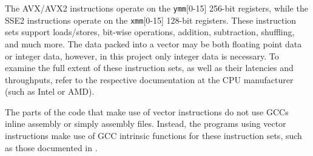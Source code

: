 The AVX/AVX2 instructions operate on the \texttt{ymm}[0-15] 256-bit registers, while the SSE2 instructions operate on the \texttt{xmm}[0-15] 128-bit registers. These instruction sets support loads/stores, bit-wise operations, addition, subtraction, shuffling, and much more. The data packed into a vector may be both floating point data or integer data, however, in this project only integer data is necessary. To examine the full extent of these instruction sets, as well as their latencies and throughputs, refer to the respective documentation at the CPU manufacturer (such as Intel or AMD).

The parts of the code that make use of vector instructions do not use GCCs inline assembly or simply assembly files. Instead, the programs using vector instructions make use of GCC intrinsic functions for these instruction sets, such as those documented in \cite{IntelIntr}.

\newpage